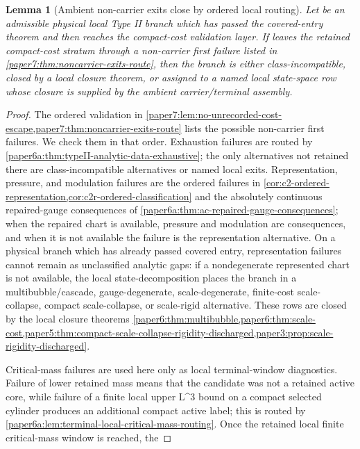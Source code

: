 \documentclass[11pt]{amsart}
\def\({}%
\def\){}%
\theoremstyle{plain}
\newtheorem{lemma}[lemma]{Lemma}
\theoremstyle{definition}
\theoremstyle{remark}
\begin{document}
\begin{lemma}[Ambient non-carrier exits close by ordered local routing]
\label{paper7:lem:ambient-noncarrier-exits-close}
Let \(\omega\) be an admissible physical local Type II branch which has passed
the covered-entry theorem and then reaches the compact-cost validation layer.
If \(\omega\) leaves the retained compact-cost stratum through a non-carrier
first failure listed in \cref{paper7:thm:noncarrier-exits-route}, then the
branch is either class-incompatible, closed by a local closure theorem, or
assigned to a named local state-space row whose closure is supplied by the
ambient carrier/terminal assembly.
\end{lemma}

\begin{proof}
The ordered validation in
\cref{paper7:lem:no-unrecorded-cost-escape,paper7:thm:noncarrier-exits-route}
lists the possible non-carrier first failures.  We check them in that order.
Exhaustion failures are routed by
\cref{paper6a:thm:typeII-analytic-data-exhaustive}; the only alternatives not
retained there are class-incompatible alternatives or named local exits.
Representation, pressure, and modulation failures are the ordered failures in
\cref{cor:c2-ordered-representation,cor:c2r-ordered-classification} and the
absolutely continuous repaired-gauge consequences of
\cref{paper6a:thm:ac-repaired-gauge-consequences}; when the repaired chart is
available, pressure and modulation are consequences, and when it is not
available the failure is the representation alternative.  On a physical branch
which has already passed covered entry, representation failures cannot remain
as unclassified analytic gaps: if a nondegenerate represented chart is not
available, the local state-decomposition places the branch in a
multibubble/cascade, gauge-degenerate, scale-degenerate, finite-cost
scale-collapse, compact scale-collapse, or scale-rigid alternative.  These rows
are closed by the local closure theorems
\cref{paper6:thm:multibubble,paper6:thm:scale-cost,paper5:thm:compact-scale-collapse-rigidity-discharged,paper3:prop:scale-rigidity-discharged}.
\par
Critical-mass failures are used here only as local terminal-window diagnostics.
Failure of lower retained mass means that the candidate was not a retained
active core, while failure of a finite local upper \(L^3\) bound on a compact
selected cylinder produces an additional compact active label; this is routed by
\cref{paper6a:lem:terminal-local-critical-mass-routing}.  Once the retained
local finite critical-mass window is reached, the

\end{proof}
\end{document}
